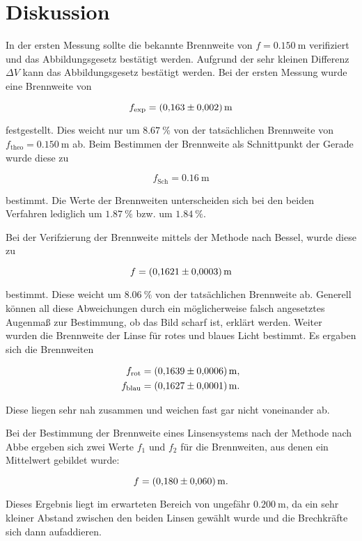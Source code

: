 \section{Diskussion}
\label{sec:Diskussion}

In der ersten Messung sollte die bekannte Brennweite von $f = \SI{0.150}{\meter}$ verifiziert und das 
Abbildungsgesetz bestätigt werden. Aufgrund der sehr kleinen Differenz $\Delta V$ kann das Abbildungsgesetz
bestätigt werden. Bei der ersten Messung wurde eine Brennweite von 

\begin{equation*}
f_\text{exp} = \SI{0.163+-0.002}{\meter}
\end{equation*}

festgestellt. Dies weicht nur um $\SI{8.67}{\percent}$ von der tatsächlichen Brennweite von 
$f_\text{theo}=\SI{0.150}{\meter}$ ab. Beim Bestimmen der Brennweite als Schnittpunkt der 
Gerade wurde diese zu 

\begin{equation*}
f_\text{Sch} = \SI{0.16}{\meter} 
\end{equation*}

bestimmt. Die Werte der Brennweiten unterscheiden sich bei den beiden Verfahren lediglich um 
$\SI{1.87}{\percent}$ bzw. um $\SI{1.84}{\percent}$. 

Bei der Verifzierung der Brennweite mittels der Methode nach Bessel, wurde diese zu 

\begin{equation*}
f = \SI{0.1621+-0.0003}{\meter}
\end{equation*}

bestimmt. Diese weicht um $\SI{8.06}{\percent}$ von der tatsächlichen Brennweite ab. Generell 
können all diese Abweichungen durch ein möglicherweise falsch angesetztes Augenmaß zur Bestimmung, ob das 
Bild scharf ist, erklärt werden. Weiter wurden die Brennweite der Linse für rotes und blaues Licht 
bestimmt. Es ergaben sich die Brennweiten

\begin{align*}
f_\text{rot} &= \SI{0.1639+-0.0006}{\meter},\\
f_\text{blau} & = \SI{0.1627+-0.0001}{\meter}.
\end{align*}

Diese liegen sehr nah zusammen und weichen fast gar nicht voneinander ab. 

Bei der Bestimmung der Brennweite eines Linsensystems nach der Methode nach Abbe ergeben sich 
zwei Werte $f_1$ und $f_2$ für die Brennweiten, aus denen ein Mittelwert gebildet wurde:

\begin{equation*}
f = \SI{0.180+-0.060}{\meter}.
\end{equation*}

Dieses Ergebnis liegt im erwarteten Bereich von ungefähr $\SI{0.200}{\meter}$, da ein 
sehr kleiner Abstand zwischen den beiden Linsen gewählt wurde und die Brechkräfte sich dann
aufaddieren. 